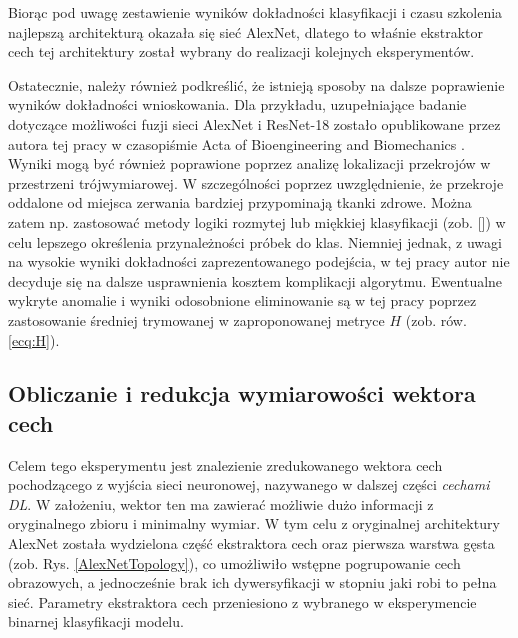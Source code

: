 Biorąc pod uwagę zestawienie wyników dokładności klasyfikacji i czasu szkolenia najlepszą architekturą okazała się sieć AlexNet, dlatego to właśnie ekstraktor cech tej architektury został wybrany do realizacji kolejnych eksperymentów. 

Ostatecznie, należy również podkreślić, że istnieją sposoby na dalsze poprawienie wyników dokładności wnioskowania. Dla przykładu, uzupełniające badanie dotyczące możliwości fuzji sieci AlexNet i ResNet-18 zostało opublikowane przez autora tej pracy w czasopiśmie Acta of Bioengineering and Biomechanics \cite{Kapinski19}. Wyniki mogą być również poprawione poprzez analizę lokalizacji przekrojów w przestrzeni trójwymiarowej. W szczególności poprzez uwzględnienie, że przekroje oddalone od miejsca zerwania bardziej przypominają tkanki zdrowe. Można zatem np. zastosować metody logiki rozmytej lub miękkiej klasyfikacji (zob. []) w celu lepszego określenia przynależności próbek do klas. Niemniej jednak, z uwagi na wysokie wyniki dokładności zaprezentowanego podejścia, w tej pracy autor nie decyduje się na dalsze usprawnienia kosztem komplikacji algorytmu. Ewentualne wykryte anomalie i wyniki odosobnione eliminowanie są w tej pracy poprzez zastosowanie średniej trymowanej w zaproponowanej metryce $H$ (zob. rów. \ref{ecq:H}).

\subsection{Obliczanie i redukcja wymiarowości wektora cech}

Celem tego eksperymentu jest znalezienie zredukowanego wektora cech pochodzącego z wyjścia sieci neuronowej, nazywanego w dalszej części \textit{cechami DL}. W założeniu, wektor ten ma zawierać możliwie dużo informacji z oryginalnego zbioru i minimalny wymiar. W tym celu z oryginalnej architektury AlexNet została wydzielona część ekstraktora cech oraz pierwsza warstwa gęsta (zob. Rys. \ref{AlexNetTopology}), co umożliwiło wstępne pogrupowanie cech obrazowych, a jednocześnie brak ich dywersyfikacji w stopniu jaki robi to pełna sieć. Parametry ekstraktora cech przeniesiono z wybranego w eksperymencie binarnej klasyfikacji modelu. 

